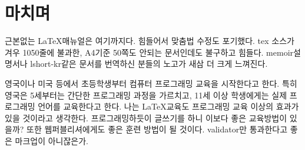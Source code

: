 \printindex

\pagestyle{empty}
\chapter*{마치며}
근본없는 \LaTeX 매뉴얼은 여기까지다. 힘들어서 맞춤법 수정도 포기했다. tex 소스가 겨우 1050줄에 불과한, A4기준 50쪽도 안되는 문서인데도 불구하고 힘들다. memoir설명서나 lshort-kr같은 문서를 번역하신 분들의 노고가 새삼 더 크게 느껴진다.

영국이나 미국 등에서 초등학생부터 컴퓨터 프로그래밍 교육을 시작한다고 한다. 특히 영국은 5세부터는 간단한 프로그래밍 과정을 가르치고, 11세 이상 학생에게는 실제 프로그래밍 언어를 교육한다고 한다. 나는 \LaTeX 교육도 프로그래밍 교육 이상의 효과가 있을 것이라고 생각한다. 프로그래밍하듯이 글쓰기를 하니 이보다 좋은 교육방법이 있을까? 또한 웹퍼블리셔에게도 좋은 훈련 방법이 될 것이다. validator만 통과한다고 좋은 마크업이 아니잖은가.

\vfill
\begin{flushright}
\end{flushright}
